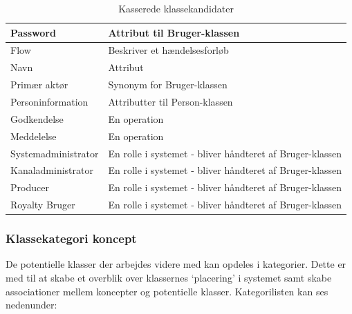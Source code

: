 \begin{table}[H]
\begin{tabularx}{\textwidth}{|X|X|}
        \hline
        Password & Attribut til Bruger-klassen\\
        \hline
        Flow & Beskriver et hændelsesforløb\\
        \hline
        Navn & Attribut \\
        \hline
        Primær aktør &  Synonym for Bruger-klassen\\
        \hline
        Personinformation &  Attributter til Person-klassen\\
        \hline
        Godkendelse & En operation \\
        \hline
        Meddelelse & En operation \\
        \hline
        Systemadministrator & En rolle i systemet - bliver håndteret af Bruger-klassen \\
        \hline
        Kanaladministrator & En rolle i systemet - bliver håndteret af Bruger-klassen \\
        \hline 
        Producer & En rolle i systemet - bliver håndteret af Bruger-klassen \\
        \hline
        Royalty Bruger & En rolle i systemet - bliver håndteret af Bruger-klassen \\
        \hline
    \end{tabularx}
    \caption{Kasserede klassekandidater}
    \label{table:deleted_class_candidates}
\end{table}


\subsubsection{Klassekategori koncept}
De potentielle klasser der arbejdes videre med kan opdeles i kategorier. Dette er med til at skabe et overblik over klassernes ‘placering’ i systemet samt skabe associationer mellem koncepter og potentielle klasser. Kategorilisten kan ses nedenunder:

